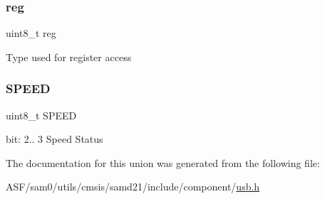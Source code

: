 \subsubsection{\texorpdfstring{reg}{reg}}
{\footnotesize\ttfamily uint8\+\_\+t reg}

Type used for register access \mbox{\label{union_u_s_b___d_e_v_i_c_e___s_t_a_t_u_s___type_a7244b81de139c5a3f12fbb9eb8e89647}} 
\subsubsection{\texorpdfstring{SPEED}{SPEED}}
{\footnotesize\ttfamily uint8\+\_\+t S\+P\+E\+ED}

bit\+: 2.. 3 Speed Status 

The documentation for this union was generated from the following file\+:\begin{DoxyCompactItemize}
\item 
A\+S\+F/sam0/utils/cmsis/samd21/include/component/\mbox{\hyperlink{component_2usb_8h}{usb.\+h}}\end{DoxyCompactItemize}
